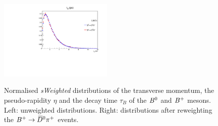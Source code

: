 \begin{figure}[t]
\begin{center}
   \includegraphics[width=0.49\textwidth]{AA-Appdx-OSTaggers/figs/BTAU_BuVSBd_Weighted.pdf} \\
  \end{center}
  \vspace{-2mm}
  \caption{Normalised \emph{sWeighted} distributions of the transverse momentum, the pseudo-rapidity $\eta$ and the decay time $\tau_{B}$ of the $B^0$ and $B^+$ mesons. Left: unweighted distributions. Right: distributions after reweighting the $B^+\rightarrow\kern 0.2em\overline{\kern -0.2em D}{}^0\pi^+$ events.}
  \label{fig:reweightingOSgb1}
\end{figure}
